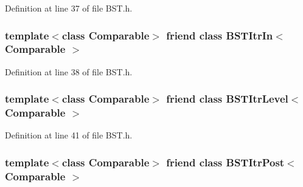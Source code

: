 Definition at line 37 of file B\-S\-T.\-h.

\hypertarget{class_binary_node_aab3993acac2ab24a0b59edb0c3acc775}{
\subsubsection[{B\-S\-T\-Itr\-In$<$ Comparable $>$}]{\setlength{\rightskip}{0pt plus 5cm}template$<$class Comparable$>$ friend class {\bf B\-S\-T\-Itr\-In}$<$ Comparable $>$\hspace{0.3cm}{\ttfamily [friend]}}}\label{class_binary_node_aab3993acac2ab24a0b59edb0c3acc775}


Definition at line 38 of file B\-S\-T.\-h.

\hypertarget{class_binary_node_a26ff00bc0d87069aed877f10fd3c80a8}{
\subsubsection[{B\-S\-T\-Itr\-Level$<$ Comparable $>$}]{\setlength{\rightskip}{0pt plus 5cm}template$<$class Comparable$>$ friend class {\bf B\-S\-T\-Itr\-Level}$<$ Comparable $>$\hspace{0.3cm}{\ttfamily [friend]}}}\label{class_binary_node_a26ff00bc0d87069aed877f10fd3c80a8}


Definition at line 41 of file B\-S\-T.\-h.

\hypertarget{class_binary_node_a5dc153694be266f6e772659486219da7}{
\subsubsection[{B\-S\-T\-Itr\-Post$<$ Comparable $>$}]{\setlength{\rightskip}{0pt plus 5cm}template$<$class Comparable$>$ friend class {\bf B\-S\-T\-Itr\-Post}$<$ Comparable $>$\hspace{0.3cm}{\ttfamily [friend]}}}\label{class_binary_node_a5dc153694be266f6e772659486219da7}


